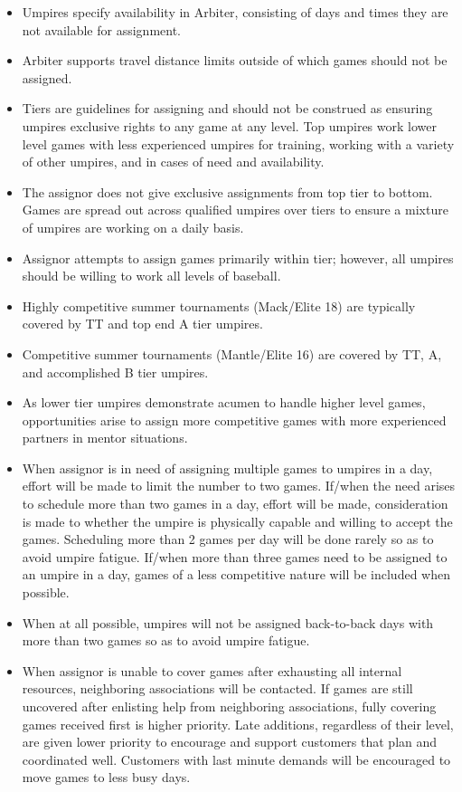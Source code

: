 \documentclass[letterpaper,11pt,colorlinks=true,allcolors=blue]{article}
\begin{document}
\begin{itemize}
\item Umpires specify availability in Arbiter, consisting of days and times they are not available for assignment.
\item Arbiter supports travel distance limits outside of which games should not be assigned.
\item Tiers are guidelines for assigning and should not be construed as ensuring umpires exclusive rights to any game at any level.  Top umpires work lower level games with less experienced umpires for training, working with a variety of other umpires, and in cases of need and availability.
\item The assignor does not give exclusive assignments from top tier to bottom.  Games are spread out across qualified umpires over tiers to ensure a mixture of umpires are working on a daily basis.
\item Assignor attempts to assign games primarily within tier; however, all umpires should be willing to work all levels of baseball.
\item Highly competitive summer tournaments (Mack/Elite 18) are typically covered by TT and top end A tier umpires.
\item Competitive summer tournaments (Mantle/Elite 16) are covered by TT, A, and accomplished B tier umpires.
\item As lower tier umpires demonstrate acumen to handle higher level games, opportunities arise to assign more competitive games with more experienced partners in mentor situations.
\item When assignor is in need of assigning multiple games to umpires in a day, effort will be made to limit the number to two games.  If/when the need arises to schedule more than two games in a day, effort will be made, consideration is made to whether the umpire is physically capable and willing to accept the games.  Scheduling more than 2 games per day will be done rarely so as to avoid umpire fatigue.  If/when more than three games need to be assigned to an umpire in a day, games of a less competitive nature will be included when possible.
\item When at all possible, umpires will not be assigned back-to-back days with more than two games so as to avoid umpire fatigue.
\item When assignor is unable to cover games after exhausting all internal resources, neighboring associations will be contacted.  If games are still uncovered after enlisting help from neighboring associations, fully covering games received first is higher priority.  Late additions, regardless of their level, are given lower priority to encourage and support customers that plan and coordinated well.  Customers with last minute demands will be encouraged to move games to less busy days.

\end{itemize}
\end{document}
